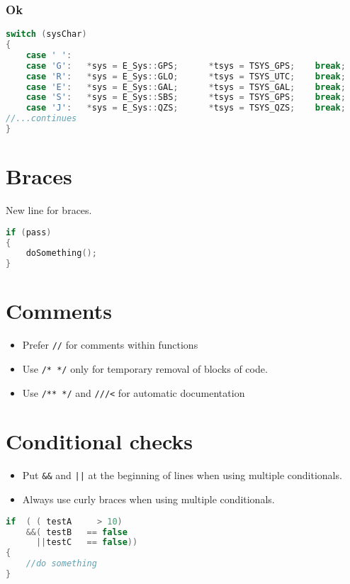 \subsubsection{Ok}	

\begin{lstlisting}[language=c++]
switch (sysChar)
{
    case ' ':
    case 'G':   *sys = E_Sys::GPS;      *tsys = TSYS_GPS;    break;
    case 'R':   *sys = E_Sys::GLO;      *tsys = TSYS_UTC;    break;
    case 'E':   *sys = E_Sys::GAL;      *tsys = TSYS_GAL;    break;
    case 'S':   *sys = E_Sys::SBS;      *tsys = TSYS_GPS;    break;
    case 'J':   *sys = E_Sys::QZS;      *tsys = TSYS_QZS;    break;
//...continues
}
\end{lstlisting}

\section{Braces}

New line for braces.
\begin{lstlisting}[language=c++]
if (pass)
{
    doSomething();
}
\end{lstlisting}

\section{Comments}

\begin{itemize}
\item Prefer \lstinline{//} for comments within functions
\item Use \lstinline{/* */} only for temporary removal of blocks of code.
\item Use \lstinline{/** */} and \lstinline{///<} for automatic documentation
\end{itemize}

\section{Conditional checks}
%
\begin{itemize}
\item  Put \lstinline{&&} and \lstinline{||} at the beginning of lines when using multiple conditionals.
\item  Always use curly braces when using multiple conditionals.
\end{itemize}
%
\begin{lstlisting}[language=c++]
if  ( ( testA     > 10)
    &&( testB   == false
      ||testC   == false))
{
    //do something
}
\end{lstlisting}

